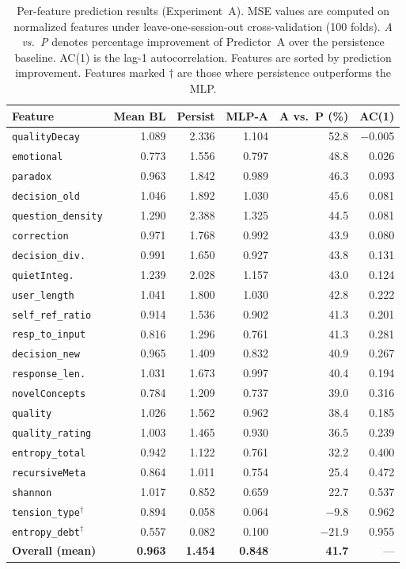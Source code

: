 \documentclass[twoside,11pt]{article}
\begin{document}
\begin{table}[t]
\caption{Per-feature prediction results (Experiment~A). MSE values are computed
on normalized features under leave-one-session-out cross-validation (100 folds).
\emph{A vs.\ P} denotes percentage improvement of Predictor~A over the
persistence baseline. AC(1) is the lag-1 autocorrelation. Features are sorted
by prediction improvement. Features marked $\dagger$ are those where
persistence outperforms the MLP.}
\label{tab:results-main}
\centering
\small
\begin{tabular}{@{}lrrrrr@{}}
\toprule
Feature & Mean BL & Persist & MLP-A & A vs.\ P (\%) & AC(1) \\
\midrule
\texttt{qualityDecay}     & 1.089 & 2.336 & 1.104 & 52.8 & $-$0.005 \\
\texttt{emotional}        & 0.773 & 1.556 & 0.797 & 48.8 & 0.026 \\
\texttt{paradox}          & 0.963 & 1.842 & 0.989 & 46.3 & 0.093 \\
\texttt{decision\_old}    & 1.046 & 1.892 & 1.030 & 45.6 & 0.081 \\
\texttt{question\_density}& 1.290 & 2.388 & 1.325 & 44.5 & 0.081 \\
\texttt{correction}       & 0.971 & 1.768 & 0.992 & 43.9 & 0.080 \\
\texttt{decision\_div.}   & 0.991 & 1.650 & 0.927 & 43.8 & 0.131 \\
\texttt{quietInteg.}      & 1.239 & 2.028 & 1.157 & 43.0 & 0.124 \\
\texttt{user\_length}     & 1.041 & 1.800 & 1.030 & 42.8 & 0.222 \\
\texttt{self\_ref\_ratio}  & 0.914 & 1.536 & 0.902 & 41.3 & 0.201 \\
\texttt{resp\_to\_input}  & 0.816 & 1.296 & 0.761 & 41.3 & 0.281 \\
\texttt{decision\_new}    & 0.965 & 1.409 & 0.832 & 40.9 & 0.267 \\
\texttt{response\_len.}   & 1.031 & 1.673 & 0.997 & 40.4 & 0.194 \\
\texttt{novelConcepts}    & 0.784 & 1.209 & 0.737 & 39.0 & 0.316 \\
\texttt{quality}          & 1.026 & 1.562 & 0.962 & 38.4 & 0.185 \\
\texttt{quality\_rating}  & 1.003 & 1.465 & 0.930 & 36.5 & 0.239 \\
\texttt{entropy\_total}   & 0.942 & 1.122 & 0.761 & 32.2 & 0.400 \\
\texttt{recursiveMeta}    & 0.864 & 1.011 & 0.754 & 25.4 & 0.472 \\
\texttt{shannon}          & 1.017 & 0.852 & 0.659 & 22.7 & 0.537 \\
\midrule
\texttt{tension\_type}$^\dagger$  & 0.894 & 0.058 & 0.064 & $-$9.8 & 0.962 \\
\texttt{entropy\_debt}$^\dagger$  & 0.557 & 0.082 & 0.100 & $-$21.9 & 0.955 \\
\midrule
\textbf{Overall (mean)}   & \textbf{0.963} & \textbf{1.454} & \textbf{0.848}
  & \textbf{41.7} & --- \\
\bottomrule
\end{tabular}
\end{table}
\end{document}
